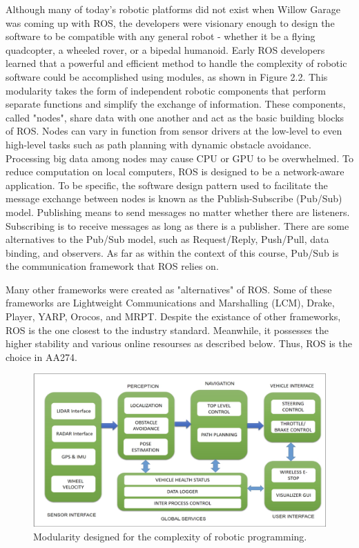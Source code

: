 \documentclass[twoside]{article}
\begin{document}
Although many of today's robotic platforms did not exist when Willow Garage was coming up with ROS, the developers were visionary enough to design the software to be compatible with any general robot - whether it be a flying quadcopter, a wheeled rover, or a bipedal humanoid. Early ROS developers learned that a powerful and efficient method to handle the complexity of robotic software could be accomplished using modules, as shown in Figure 2.2. This modularity takes the form of independent robotic components that perform separate functions and simplify the exchange of information. These components, called "nodes", share data with one another and act as the basic building blocks of ROS. Nodes can vary in function from sensor drivers at the low-level to even high-level tasks such as path planning with dynamic obstacle avoidance. Processing big data among nodes may cause CPU or GPU to be overwhelmed. To reduce computation on local computers, ROS is designed to be a network-aware application. To be specific, the software design pattern used to facilitate the message exchange between nodes is known as the Publish-Subscribe (Pub/Sub) model. Publishing means to send messages no matter whether there are listeners. Subscribing is to receive messages as long as there is a publisher. There are some alternatives to the Pub/Sub model, such as Request/Reply, Push/Pull, data binding, and observers. As far as within the context of this course, Pub/Sub is the communication framework that ROS relies on.

Many other frameworks were created as "alternatives" of ROS. Some of these frameworks are Lightweight Communications and Marshalling (LCM), Drake, Player, YARP, Orocos, and MRPT. Despite the existance of other frameworks, ROS is the one closest to the industry standard. Meanwhile, it possesses the higher stability and various online resourses as described below. Thus, ROS is the choice in AA274.
\begin{figure}[ht]
\centering
\includegraphics[width=1\textwidth]{ModularityPhoto}
\caption{Modularity designed for the complexity of robotic programming.}
\end{figure}
\end{document}
